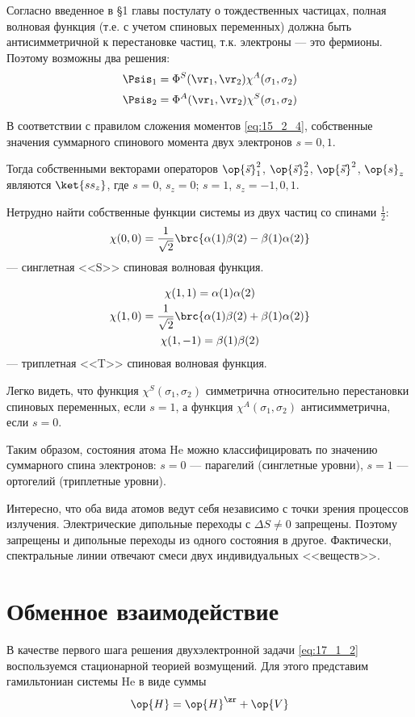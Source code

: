 Согласно введенное в \S 1 главы  постулату о тождественных частицах, полная волновая функция (т.е. с учетом спиновых переменных) должна быть антисимметричной к перестановке частиц, т.к. электроны --- это фермионы. Поэтому возможны два решения:
$$
\Psis_1 = \Phi^S(\vr_1, \vr_2) \chi^A(\sigma_1, \sigma_2)
$$
$$
\Psis_2 = \Phi^A(\vr_1, \vr_2) \chi^S(\sigma_1, \sigma_2)
$$

В соответствии с правилом сложения моментов \eqref{eq:15_2_4}, собственные значения суммарного спинового момента двух электронов $s = 0, 1$.

Тогда собственными векторами операторов $\op{\vec{s}}_1^2$, $\op{\vec{s}}_2^2$, $\op{\vec{s}}^2$, $\op{s}_z$ являются $\ket{s s_z}$, где $s = 0$, $s_z = 0$; $s = 1$, $s_z=-1, 0, 1$.

Нетрудно найти собственные функции системы из двух частиц со спинами $\frac{1}{2}$:
$$
\chi(0, 0) = \frac{1}{\sqrt{2}}\brc{\alpha(1)\beta(2) - \beta(1)\alpha(2)}
$$
--- синглетная <<S>> спиновая волновая функция.

\begin{gather*}
\chi(1, 1) = \alpha(1)\alpha(2) \\
\chi(1, 0) = \frac{1}{\sqrt{2}}\brc{\alpha(1)\beta(2) + \beta(1)\alpha(2)} \\
\chi(1, -1) = \beta(1)\beta(2)
\end{gather*}
--- триплетная <<T>> спиновая волновая функция.

Легко видеть, что функция $\chi^S(\sigma_1, \sigma_2)$ симметрична относительно перестановки спиновых переменных, если $s = 1$, а функция $\chi^A(\sigma_1, \sigma_2)$ антисимметрична, если $s = 0$.

Таким образом, состояния атома He можно классифицировать по значению суммарного спина электронов: $s = 0$ --- парагелий (синглетные уровни), $s = 1$ --- ортогелий (триплетные уровни).

Интересно, что оба вида атомов ведут себя независимо с точки зрения процессов излучения. Электрические дипольные переходы с $\Delta S \neq 0$ запрещены. Поэтому запрещены и дипольные переходы из одного состояния в другое. Фактически, спектральные линии отвечают смеси двух индивидуальных <<веществ>>.

\section{Обменное взаимодействие}

В качестве первого шага решения двухэлектронной задачи \eqref{eq:17_1_2} воспользуемся стационарной теорией возмущений. Для этого представим гамильтониан системы He в виде суммы
$$
\op{H} = \op{H}^\zr + \op{V}
$$

